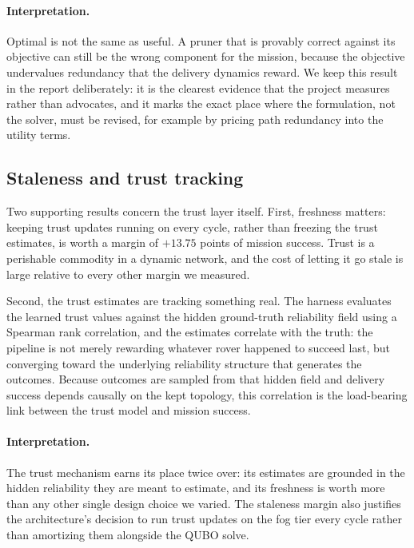 \paragraph{Interpretation.}
Optimal is not the same as useful. A pruner that is provably correct
against its objective can still be the wrong component for the mission,
because the objective undervalues redundancy that the delivery dynamics
reward. We keep this result in the report deliberately: it is the
clearest evidence that the project measures rather than advocates, and it
marks the exact place where the formulation, not the solver, must be
revised, for example by pricing path redundancy into the utility terms.

\subsection{Staleness and trust tracking}
\label{sec:res-trust}

Two supporting results concern the trust layer itself. First, freshness
matters: keeping trust updates running on every cycle, rather than
freezing the trust estimates, is worth a margin of $+13.75$ points of
mission success. Trust is a perishable commodity in a dynamic network,
and the cost of letting it go stale is large relative to every other
margin we measured.

Second, the trust estimates are tracking something real. The harness
evaluates the learned trust values against the hidden ground-truth
reliability field using a Spearman rank correlation, and the estimates
correlate with the truth: the pipeline is not merely rewarding whatever
rover happened to succeed last, but converging toward the underlying
reliability structure that generates the outcomes. Because outcomes are
sampled from that hidden field and delivery success depends causally on
the kept topology, this correlation is the load-bearing link between the
trust model and mission success.

\paragraph{Interpretation.}
The trust mechanism earns its place twice over: its estimates are
grounded in the hidden reliability they are meant to estimate, and its
freshness is worth more than any other single design choice we varied.
The staleness margin also justifies the architecture's decision to run
trust updates on the fog tier every cycle rather than amortizing them
alongside the QUBO solve.


